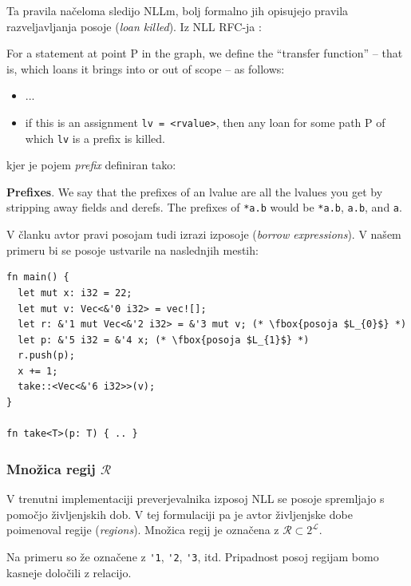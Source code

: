 \documentclass{article}
\begin{document}
Ta pravila načeloma sledijo NLLm, bolj formalno jih opisujejo pravila razveljavljanja posoje (\textit{loan killed}).
Iz NLL RFC-ja \cite{2094nllRustRFC}:

\begin{displayquote}
	For a statement at point P in the graph, we define the “transfer function” – that is,
	which loans it brings into or out of scope – as follows:
	\begin{itemize}
		\item ...
		\item if this is an assignment \verb|lv = <rvalue>|, then any loan for some path P of which \verb|lv| is a prefix is killed.
	\end{itemize}
\end{displayquote}

kjer je pojem \textit{prefix} definiran tako:

\begin{displayquote}
	\textbf{Prefixes}. We say that the prefixes of an lvalue are all the lvalues you get by stripping away fields and derefs.
	The prefixes of \verb|*a.b| would be \verb|*a.b|, \verb|a.b|, and \verb|a|.
\end{displayquote}

V članku avtor pravi posojam tudi izrazi izposoje (\textit{borrow expressions}). V našem primeru bi se posoje ustvarile na naslednjih
mestih:

\begin{lstlisting}
fn main() {
  let mut x: i32 = 22;
  let mut v: Vec<&'0 i32> = vec![];
  let r: &'1 mut Vec<&'2 i32> = &'3 mut v; (* \fbox{posoja $L_{0}$} *)
  let p: &'5 i32 = &'4 x; (* \fbox{posoja $L_{1}$} *)
  r.push(p);
  x += 1;
  take::<Vec<&'6 i32>>(v);
}

fn take<T>(p: T) { .. }
\end{lstlisting}

\subsubsection{Množica regij $\mathcal{R}$}

V trenutni implementaciji preverjevalnika izposoj NLL se posoje spremljajo s pomočjo življenjskih dob.
V tej formulaciji pa je avtor življenjske dobe poimenoval regije (\textit{regions}).
Množica regij je označena z $\mathcal{R} \subset 2^{\mathcal{L}}$.

Na primeru so že označene z \verb|'1|, \verb|'2|, \verb|'3|, itd. Pripadnost posoj regijam bomo kasneje določili z relacijo.
\end{document}
